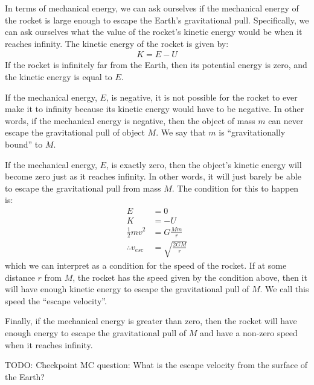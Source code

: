 In terms of mechanical energy, we can ask ourselves if the mechanical energy of the rocket is large enough to escape the Earth's gravitational pull. Specifically, we can ask ourselves what the value of the rocket's kinetic energy would be when it reaches infinity. The kinetic energy of the rocket is given by:
\begin{align*}
K = E - U
\end{align*} 
If the rocket is infinitely far from the Earth, then its potential energy is zero, and the kinetic energy is equal to $E$.

If the mechanical energy, $E$, is negative, it is not possible for the rocket to ever make it to infinity because its kinetic energy would have to be negative. In other words, if the mechanical energy is negative, then the object of mass $m$ can never escape the gravitational pull of object $M$. We say that $m$ is ``gravitationally bound'' to $M$.

If the mechanical energy, $E$, is exactly zero, then the object's kinetic energy will become zero just as it reaches infinity. In other words, it will just barely be able to escape the gravitational pull from mass $M$. The condition for this to happen is:
\begin{align*}
E &= 0\\
K & = -U\\
\frac{1}{2}mv^2 &= G\frac{Mm}{r}\\
\therefore v_{esc} &= \sqrt{\frac{2GM}{r}}
\end{align*}
which we can interpret as a condition for the speed of the rocket. If at some distance $r$ from $M$, the rocket has the speed given by the condition above, then it will have enough kinetic energy to escape the gravitational pull of $M$. We call this speed the ``escape velocity''. 

Finally, if the mechanical energy is greater than zero, then the rocket will have enough energy to escape the gravitational pull of $M$ and have a non-zero speed when it reaches infinity. 

TODO: Checkpoint MC question: What is the escape velocity from the surface of the Earth?

